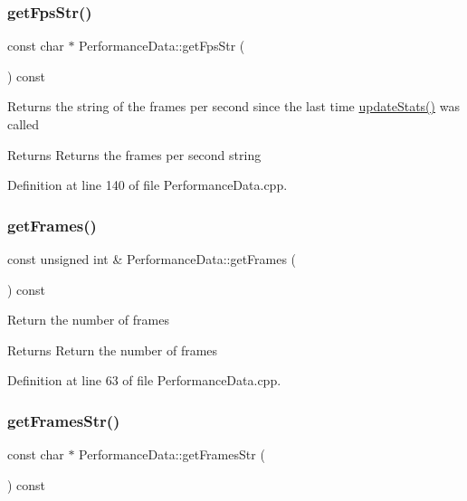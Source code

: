\subsubsection{\texorpdfstring{get\+Fps\+Str()}{getFpsStr()}}
{\footnotesize\ttfamily const char $\ast$ Performance\+Data\+::get\+Fps\+Str (\begin{DoxyParamCaption}{ }\end{DoxyParamCaption}) const}

Returns the string of the frames per second since the last time \hyperlink{class_performance_data_a622d01a9d885596c79a799f03676c990}{update\+Stats()} was called \begin{DoxyReturn}{Returns}
Returns the frames per second string 
\end{DoxyReturn}


Definition at line 140 of file Performance\+Data.\+cpp.

\mbox{\label{class_performance_data_a9ffcce90095cc9614f88b6ac25ff129d}} 
\subsubsection{\texorpdfstring{get\+Frames()}{getFrames()}}
{\footnotesize\ttfamily const unsigned int \& Performance\+Data\+::get\+Frames (\begin{DoxyParamCaption}{ }\end{DoxyParamCaption}) const}

Return the number of frames \begin{DoxyReturn}{Returns}
Return the number of frames 
\end{DoxyReturn}


Definition at line 63 of file Performance\+Data.\+cpp.

\mbox{\label{class_performance_data_a9f96571086d202296dd4bc3d799b4ac0}} 
\subsubsection{\texorpdfstring{get\+Frames\+Str()}{getFramesStr()}}
{\footnotesize\ttfamily const char $\ast$ Performance\+Data\+::get\+Frames\+Str (\begin{DoxyParamCaption}{ }\end{DoxyParamCaption}) const}

